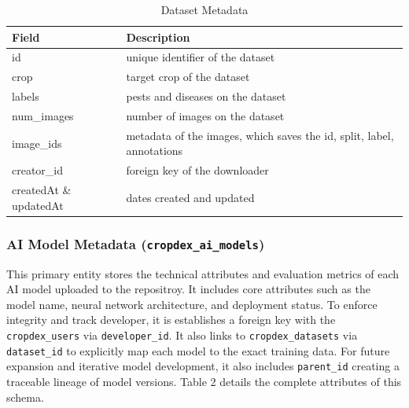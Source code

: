 \documentclass{icsthesis}
\begin{document}
\begin{mainmatter}
            \begin{table}[htbp]
                \centering
                \caption{Dataset Metadata}
                \label{tab:dataset_metadata}
                \begin{tabular}{p{} p{}}
                    \toprule
                    \textbf{Field}      & \textbf{Description} \\ 
                    \midrule
                    id                      & unique identifier of the dataset \\ 
                    crop                    & target crop of the dataset \\ 
                    labels                  & pests and diseases on the dataset \\ 
                    num\_images             & number of images on the dataset \\ 
                    image\_ids              & metadata of the images, which saves the id, split, label, annotations \\ 
                    creator\_id             & foreign key of the downloader \\ 
                    createdAt \& updatedAt  & dates created and updated \\
                    \bottomrule
                \end{tabular}
            \end{table}
            
            \subsubsection{AI Model Metadata (\texttt{cropdex\_ai\_models})}
            This primary entity stores the technical attributes and evaluation metrics of each AI model uploaded to the repositroy. It includes core attributes such as the model name, neural network architecture, and deployment status. To enforce integrity and track developer, it is establishes a foreign key with the \texttt{cropdex\_users} via \texttt{developer\_id}. It also links to \texttt{cropdex\_datasets} via \texttt{dataset\_id} to explicitly map each model to the exact training data. For future expansion and iterative model development, it also includes \texttt{parent\_id} creating a traceable lineage of model versions. Table 2 details the complete attributes of this schema.
            

\end{mainmatter}
\end{document}
